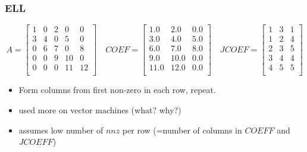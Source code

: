 \documentclass[10pt]{beamer}
\begin{document}
\begin{frame}
\frametitle{ELL}
\begin{equation*}
A=
\begin{bmatrix}
1 & 0 & 2 & 0 & 0\\
3 & 4 & 0 & 5 & 0\\
0 & 6 & 7 & 0 & 8\\
0 & 0 & 9 & 10 & 0\\
0 & 0 & 0 & 11 & 12\\
\end{bmatrix}
\quad
COEF =
\begin{bmatrix}
1.0 & 2.0 & 0.0\\
3.0 & 4.0 & 5.0\\
6.0 & 7.0 & 8.0\\
9.0 & 10.0 & 0.0 \\
11.0 & 12.0 & 0.0\\
\end{bmatrix}
\quad
JCOEF=
\begin{bmatrix}
  1 & 3 & 1\\
  1 & 2 & 4\\
  2 & 3 & 5\\
  3 & 4 & 4\\
  4 & 5 & 5\\
\end{bmatrix}
\end{equation*}
  \begin{itemize}
    \item Form columns from first non-zero in each row, repeat.
    \item used more on vector machines (what? why?)
    \item assumes low number of $nnz$ per row (=number of columns in
$COEFF$ and $JCOEFF$)
  \end{itemize}
\end{frame}
\end{document}
